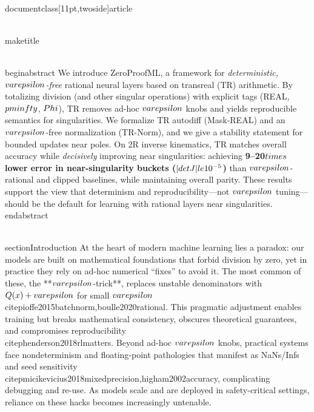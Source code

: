 \\documentclass[11pt,twoside]{article}
\begin{document}
\\maketitle

\\begin{abstract}
We introduce ZeroProofML, a framework for \emph{deterministic, $\\varepsilon$-free} rational neural layers based on transreal (TR) arithmetic. By totalizing division (and other singular operations) with explicit tags (REAL, $\\pm\\infty$, $\\Phi$), TR removes ad-hoc $\\varepsilon$ knobs and yields reproducible semantics for singularities. We formalize TR autodiff (Mask-REAL) and an $\\varepsilon$-free normalization (TR-Norm), and we give a stability statement for bounded updates near poles. On 2R inverse kinematics, TR matches overall accuracy while \emph{decisively} improving near singularities: achieving \textbf{9--20$\\times$ lower error in near-singularity buckets ($|\\det J|\\le10^{-5}$)} than $\\varepsilon$-rational and clipped baselines, while maintaining overall parity. These results support the view that determinism and reproducibility—not $\\varepsilon$ tuning—should be the default for learning with rational layers near singularities.
\\end{abstract}

\\section{Introduction}
At the heart of modern machine learning lies a paradox: our models are built on mathematical foundations that forbid division by zero, yet in practice they rely on ad-hoc numerical “fixes” to avoid it. The most common of these, the **$\\varepsilon$-trick**, replaces unstable denominators with $Q(x)+\\varepsilon$ for small $\\varepsilon$ \\citep{ioffe2015batchnorm,boulle2020rational}. This pragmatic adjustment enables training but breaks mathematical consistency, obscures theoretical guarantees, and compromises reproducibility \\citep{henderson2018rlmatters}. Beyond ad-hoc $\\varepsilon$ knobs, practical systems face nondeterminism and floating‑point pathologies that manifest as NaNs/Infs and seed sensitivity \\citep{micikevicius2018mixedprecision,higham2002accuracy}, complicating debugging and re-use. As models scale and are deployed in safety-critical settings, reliance on these hacks becomes increasingly untenable.
\end{document}
